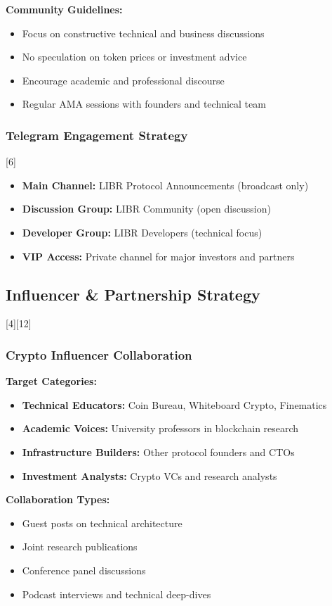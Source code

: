 \documentclass[12pt,a4paper]{article}
\begin{document}
\textbf{Community Guidelines:}
\begin{itemize}
    \item Focus on constructive technical and business discussions
    \item No speculation on token prices or investment advice
    \item Encourage academic and professional discourse
    \item Regular AMA sessions with founders and technical team
\end{itemize}

\subsubsection{Telegram Engagement Strategy}[6]
\begin{itemize}
    \item \textbf{Main Channel:} LIBR Protocol Announcements (broadcast only)
    \item \textbf{Discussion Group:} LIBR Community (open discussion)
    \item \textbf{Developer Group:} LIBR Developers (technical focus)
    \item \textbf{VIP Access:} Private channel for major investors and partners
\end{itemize}

\subsection{Influencer \& Partnership Strategy}[4][12]

\subsubsection{Crypto Influencer Collaboration}
\textbf{Target Categories:}
\begin{itemize}
    \item \textbf{Technical Educators:} Coin Bureau, Whiteboard Crypto, Finematics
    \item \textbf{Academic Voices:} University professors in blockchain research
    \item \textbf{Infrastructure Builders:} Other protocol founders and CTOs
    \item \textbf{Investment Analysts:} Crypto VCs and research analysts
\end{itemize}

\textbf{Collaboration Types:}
\begin{itemize}
    \item Guest posts on technical architecture
    \item Joint research publications
    \item Conference panel discussions
    \item Podcast interviews and technical deep-dives
\end{itemize}
\end{document}
